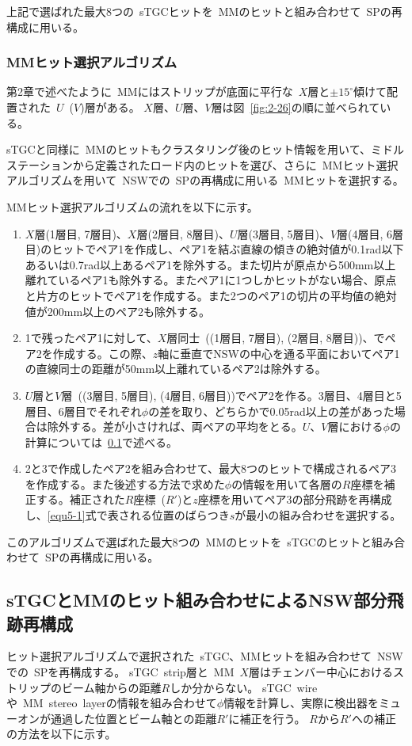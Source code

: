 上記で選ばれた最大8つの~sTGCヒットを~MMのヒットと組み合わせて~SPの再構成に用いる。

\subsubsection{MMヒット選択アルゴリズム}
第2章で述べたように~MMにはストリップが底面に平行な~$X$層と$\pm15^\circ$傾けて配置された~$U$~($V$)層がある。
$X$層、$U$層、$V$層は図~\ref{fig:2-26}の順に並べられている。

sTGCと同様に~MMのヒットもクラスタリング後のヒット情報を用いて、ミドルステーションから定義されたロード内のヒットを選び、さらに~MMヒット選択アルゴリズムを用いて~NSWでの~SPの再構成に用いる~MMヒットを選択する。

MMヒット選択アルゴリズムの流れを以下に示す。
\begin{enumerate}
    \item $X$層(1層目, 7層目)、$X$層(2層目, 8層目)、$U$層(3層目, 5層目)、$V$層(4層目, 6層目)のヒットでペア1を作成し、ペア1を結ぶ直線の傾きの絶対値が0.1rad以下あるいは0.7rad以上あるペア1を除外する。また切片が原点から500mm以上離れているペア1も除外する。またペア1に1つしかヒットがない場合、原点と片方のヒットでペア1を作成する。また2つのペア1の切片の平均値の絶対値が200mm以上のペア2も除外する。
    \item 1で残ったペア1に対して、$X$層同士~((1層目, 7層目), (2層目, 8層目))、でペア2を作成する。この際、$z$軸に垂直でNSWの中心を通る平面においてペア1の直線同士の距離が50mm以上離れているペア2は除外する。
    \item $U$層と$V$層~((3層目, 5層目), (4層目, 6層目))でペア2を作る。3層目、4層目と5層目、6層目でそれぞれ$\phi$の差を取り、どちらかで0.05rad以上の差があった場合は除外する。差が小さければ、両ペアの平均をとる。$U$、$V$層における$\phi$の計算については~\ref{chapter5-1-2}で述べる。
    \item 2と3で作成したペア2を組み合わせて、最大8つのヒットで構成されるペア3を作成する。また後述する方法で求めた$\phi$の情報を用いて各層の$R$座標を補正する。補正された$R$座標~($R'$)と$z$座標を用いてペア3の部分飛跡を再構成し、\eqref{equ5-1}式で表される位置のばらつき$s$が最小の組み合わせを選択する。
\end{enumerate}

このアルゴリズムで選ばれた最大8つの~MMのヒットを~sTGCのヒットと組み合わせて~SPの再構成に用いる。


\subsection{sTGCとMMのヒット組み合わせによるNSW部分飛跡再構成}\label{chapter5-1-2}
ヒット選択アルゴリズムで選択された~sTGC、MMヒットを組み合わせて~NSWでの~SPを再構成する。
sTGC~strip層と~MM~$X$層はチェンバー中心におけるストリップのビーム軸からの距離$R$しか分からない。
sTGC~wireや~MM~stereo~layerの情報を組み合わせて$\phi$情報を計算し、実際に検出器をミューオンが通過した位置とビーム軸との距離$R'$に補正を行う。
$R$から$R'$への補正の方法を以下に示す。

